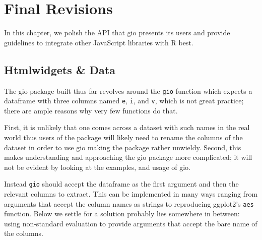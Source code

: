 \documentclass[10pt,]{krantz}
\begin{document}
\hypertarget{widgets-final}{%
\chapter{Final Revisions}\label{widgets-final}}

In this chapter, we polish the API that gio presents its users and provide guidelines to integrate other JavaScript libraries with R best.

\hypertarget{widgets-final-data}{%
\section{Htmlwidgets \& Data}\label{widgets-final-data}}

The gio package built thus far revolves around the \texttt{gio} function which expects a dataframe with three columns named \texttt{e}, \texttt{i}, and \texttt{v}, which is not great practice; there are ample reasons why very few functions do that.

First, it is unlikely that one comes across a dataset with such names in the real world thus users of the package will likely need to rename the columns of the dataset in order to use gio making the package rather unwieldy. Second, this makes understanding and approaching the gio package more complicated; it will not be evident by looking at the examples, and usage of gio.

Instead \texttt{gio} should accept the dataframe as the first argument and then the relevant columns to extract. This can be implemented in many ways ranging from arguments that accept the column names as strings to reproducing ggplot2's \texttt{aes} function. Below we settle for a solution probably lies somewhere in between: using non-standard evaluation to provide arguments that accept the bare name of the columns.
\end{document}
